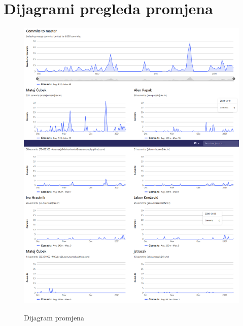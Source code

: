 					
		\eject
		\section*{Dijagrami pregleda promjena}
		
		\begin{figure}[H]
			\centering
			\includegraphics[scale=0.36]{slike/aktivnost} \\
			\caption{Dijagram promjena}
			\label{fig:dijagramPromjena}
		\end{figure}
		
	
